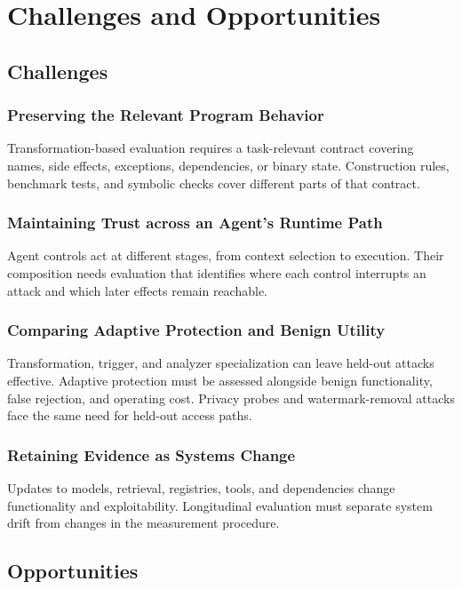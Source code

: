 \documentclass[acmsmall,screen,review,nonacm]{acmart}
\begin{document}
\section{Challenges and Opportunities}
\label{sec:open}



\subsection{Challenges}
\subsubsection{Preserving the Relevant Program Behavior}
Transformation-based evaluation requires a task-relevant contract covering names, side effects, exceptions, dependencies, or binary state. Construction rules, benchmark tests, and symbolic checks cover different parts of that contract.

\subsubsection{Maintaining Trust across an Agent's Runtime Path}
Agent controls act at different stages, from context selection to execution. Their composition needs evaluation that identifies where each control interrupts an attack and which later effects remain reachable.

\subsubsection{Comparing Adaptive Protection and Benign Utility}
Transformation, trigger, and analyzer specialization can leave held-out attacks effective. Adaptive protection must be assessed alongside benign functionality, false rejection, and operating cost. Privacy probes and watermark-removal attacks face the same need for held-out access paths.

\subsubsection{Retaining Evidence as Systems Change}
Updates to models, retrieval, registries, tools, and dependencies change functionality and exploitability. Longitudinal evaluation must separate system drift from changes in the measurement procedure.

\subsection{Opportunities}
\end{document}
